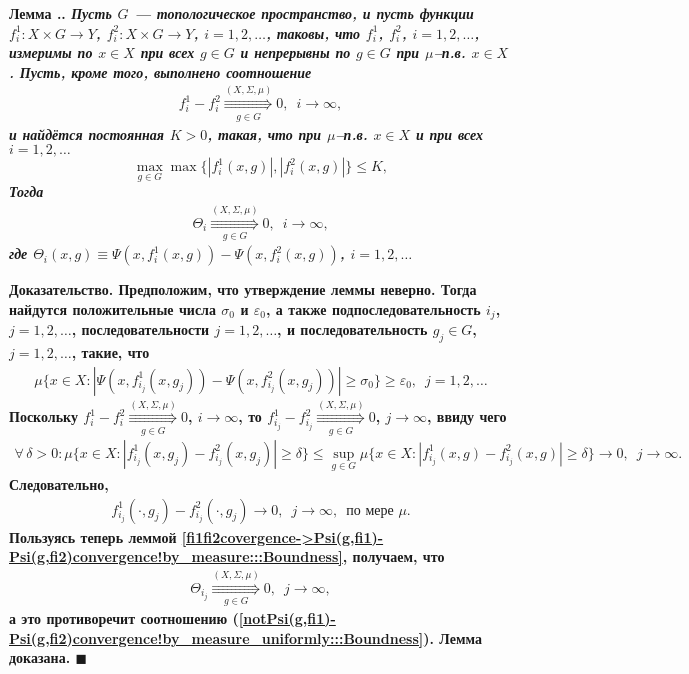 \documentclass{report}
\newcounter{lem}[section]
\renewcommand{\thelem}{\thesection.\arabic{lem}}
\newenvironment{Lemma}{\par\refstepcounter{lem}\bf Лемма \thelem. \it}{\rm\par}
\newenvironment{Proof}{\par\noindent\bf Доказательство.\rm}{ $\blacksquare$\par}
\newcommand{\ByMeasureUniformly}{\mathop{\Rrightarrow}}
\begin{document}
\begin{Lemma}\label{fi1fi2covergence->Psi(g,fi1)-Psi(g,fi2)convergence!by_measure_uniformly:::Boundness}
Пусть $G$ --- топологическое пространство, и пусть функции $f_i^1\colon X\times G\to Y$, $f_i^2\colon X\times G\to Y$, $i=1,2,\dots$, таковы, что $f_i^1$, $f_i^2$, $i=1,2,\dots$, измеримы
по $x\in X$ при всех $g\in G$ и непрерывны по $g\in G$ при $\mu$--п.в. $x\in X$. Пусть, кроме того, выполнено соотношение
\begin{gather}\label{fi1-fi2:uniform_convergence_by_measure}
f_i^1-f_i^2\ByMeasureUniformly\limits_{g\in G}^{(X,\Sigma,\mu)}0,\,\,\,i\to\infty,
\end{gather}
и найдётся постоянная $K>0$, такая, что при $\mu$--п.в. $x\in X$ и при всех $i=1,2,\dots$
$$
\max\limits_{g\in G}\max\{|f_i^1(x,g)|,|f_i^2(x,g)|\}\leqslant K,
$$
Тогда
\begin{gather*}
\Theta_i\ByMeasureUniformly\limits_{g\in G}^{(X,\Sigma,\mu)}0,\,\,\,i\to\infty,
\end{gather*}
где $\Theta_i(x,g)\equiv\Psi(x,f_i^1(x,g))-\Psi(x,f_i^2(x,g))$, $i=1,2,\dots$
\end{Lemma}
\begin{Proof}
Предположим, что утверждение леммы неверно. Тогда найдутся положительные числа $\sigma_0$ и $\varepsilon_0$, а также подпоследовательность $i_j$, $j=1,2,\dots$, последовательности
$j=1,2,\dots$, и последовательность $g_j\in G$, $j=1,2,\dots$, такие, что
\begin{gather}\label{notPsi(g,fi1)-Psi(g,fi2)convergence!by_measure_uniformly:::Boundness}
\mu\{x\in X:|\Psi(x,f_{i_j}^1(x,g_j))-\Psi(x,f_{i_j}^2(x,g_j))|\geqslant\sigma_0\}\geqslant\varepsilon_0,\,\,\,j=1,2,\dots
\end{gather}
Поскольку $f_i^1-f_i^2\ByMeasureUniformly\limits_{g\in G}^{(X,\Sigma,\mu)}0$, $i\to\infty$, то $f_{i_j}^1-f_{i_j}^2\ByMeasureUniformly\limits_{g\in G}^{(X,\Sigma,\mu)}0$, $j\to\infty$,
ввиду чего
\begin{gather*}
\forall\,\delta>0:\mu\{x\in X:|f_{i_j}^1(x,g_j)-f_{i_j}^2(x,g_j)|\geqslant\delta\}\leqslant\sup\limits_{g\in G}\mu\{x\in X:|f_{i_j}^1(x,g)-f_{i_j}^2(x,g)|\geqslant\delta\}\to0,\,\,\,
j\to\infty.
\end{gather*}
Следовательно,
\begin{gather*}
f_{i_j}^1(\cdot,g_j)-f_{i_j}^2(\cdot,g_j)\to0,\,\,\,j\to\infty,\,\,\,\text{по мере $\mu$}.
\end{gather*}
Пользуясь теперь леммой \ref{fi1fi2covergence->Psi(g,fi1)-Psi(g,fi2)convergence!by_measure:::Boundness}, получаем, что
\begin{gather*}
\Theta_{i_j}\ByMeasureUniformly\limits_{g\in G}^{(X,\Sigma,\mu)}0,\,\,\,j\to\infty,
\end{gather*}
а это противоречит соотношению (\ref{notPsi(g,fi1)-Psi(g,fi2)convergence!by_measure_uniformly:::Boundness}). Лемма доказана.
\end{Proof}
\end{document}
